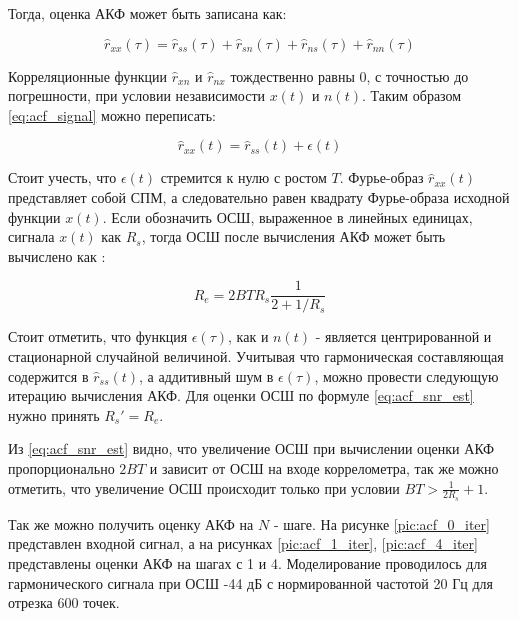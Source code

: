 Тогда, оценка АКФ может быть записана как:
\begin{center}
\begin{equation}
	\label{eq:acf_rss_signal_full}
	\hat{r}_{xx}(\tau)=\hat{r}_{ss}(\tau)+\hat{r}_{sn}(\tau)+\hat{r}_{ns}(\tau) + \hat{r}_{nn}(\tau)
\end{equation}
\end{center}

Корреляционные функции ${\hat{r}_{xn}}$ и ${\hat{r}_{nx}}$ тождественно равны 0, с точностью до погрешности, при условии независимости
${x(t)}$ и ${n(t)}$. Таким образом \ref{eq:acf_signal} можно переписать:
\begin{center}
\begin{equation}
	\label{eq:acf_rss_signal_new}
	\hat{r}_{xx}(t) = \hat{r}_{ss}(t) + \epsilon (t)
\end{equation}
\end{center}
Стоит учесть, что ${\epsilon (t)}$ стремится к нулю с ростом ${T}$. Фурье-образ ${\hat{r}_{xx}(t)}$
представляет собой СПМ, а следовательно равен квадрату Фурье-образа исходной функции ${x(t)}$.
Если обозначить ОСШ, выраженное в линейных единицах, сигнала ${x(t)}$ как ${R_s}$, тогда ОСШ после вычисления АКФ может быть вычислено
как \cite{book_max}:
\begin{center}
\begin{equation}
	\label{eq:acf_snr_est}
	R_e=2BTR_s \frac{1}{2+1/R_s}
\end{equation}
\end{center}

Стоит отметить, что функция ${\epsilon(\tau)}$, как и ${n(t)}$ - является центрированной и
стационарной случайной величиной.
Учитывая что гармоническая составляющая содержится в ${\hat{r}_{ss}(t)}$, а аддитивный шум в ${\epsilon(\tau)}$, можно провести
следующую итерацию вычисления АКФ. Для оценки ОСШ по формуле \ref{eq:acf_snr_est} нужно принять ${R_s' = R_e}$.

Из \ref{eq:acf_snr_est} видно, что увеличение ОСШ при вычислении оценки АКФ пропорционально ${2BT}$ и зависит от
ОСШ на входе коррелометра, так же можно отметить, что увеличение ОСШ происходит только при условии ${BT > \frac{1}{2R_s} + 1}$.

Так же можно получить оценку АКФ на ${N}$ - шаге. На рисунке \ref{pic:acf_0_iter} представлен входной сигнал, а на
рисунках \ref{pic:acf_1_iter}, \ref{pic:acf_4_iter} представлены оценки АКФ на шагах с 1 и 4.
Моделирование проводилось для гармонического сигнала при ОСШ -44 дБ с нормированной частотой 20 Гц для
отрезка 600 точек.

